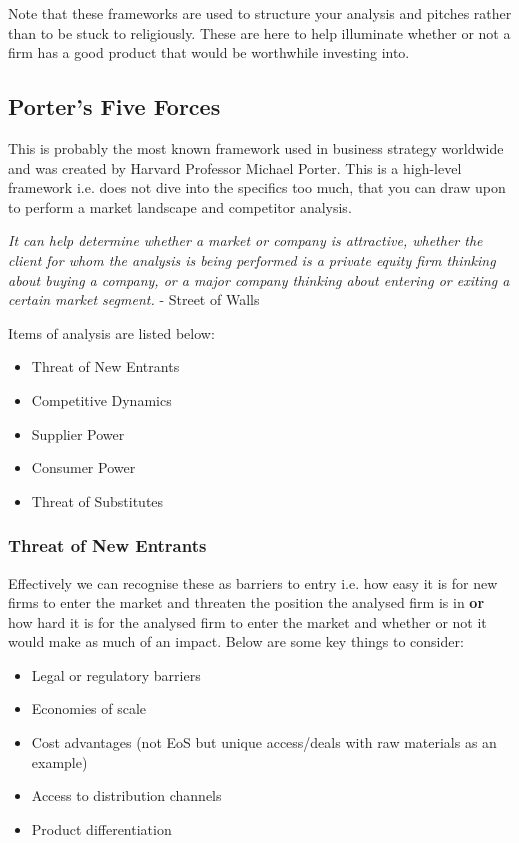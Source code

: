 \documentclass[a4paper]{article}
\begin{document}
{\vspace{5pt}
\noindent Note that these frameworks are used to structure your analysis and pitches rather than to be stuck to religiously. These are here to help illuminate whether or not a firm has a good product that would be worthwhile investing into.

\subsection{Porter's Five Forces}
This is probably the most known framework used in business strategy worldwide and was created by Harvard Professor Michael Porter. This is a high-level framework i.e. does not dive into the specifics too much, that you can draw upon to perform a market landscape and competitor analysis. 

\vspace{5pt}
\noindent \textit{It can help determine whether a market or company is attractive, whether the client for whom the analysis is being performed is a private equity firm thinking about buying a company, or a major company thinking about entering or exiting a certain market segment.} - Street of Walls

\vspace{5pt}
\noindent Items of analysis are listed below:
\begin{itemize}
	\item Threat of New Entrants
	\item Competitive Dynamics
	\item Supplier Power
	\item Consumer Power
	\item Threat of Substitutes
\end{itemize}

\subsubsection{Threat of New Entrants}
Effectively we can recognise these as barriers to entry i.e. how easy it is for new firms to enter the market and threaten the position the analysed firm is in \textbf{or} how hard it is for the analysed firm to enter the market and whether or not it would make as much of an impact. Below are some key things to consider:

\begin{itemize}
	\item Legal or regulatory barriers
	\item Economies of scale
	\item Cost advantages (not EoS but unique access/deals with raw materials as an example)
	\item Access to distribution channels
	\item Product differentiation
\end{itemize}

}
\end{document}
